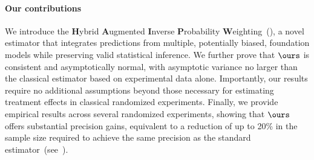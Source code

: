 \paragraph{Our contributions} We introduce the \textbf{H}ybrid \textbf{A}ugmented \textbf{I}nverse \textbf{P}robability \textbf{W}eighting~(\ours), a novel estimator that integrates predictions from multiple, potentially biased, foundation models while preserving valid statistical inference. We further prove that $\ours$ is consistent and asymptotically normal, with asymptotic variance no larger than the classical estimator based on experimental data alone. Importantly, our results require no additional assumptions beyond those necessary for estimating treatment effects in classical randomized experiments. Finally, we provide empirical results across several randomized experiments, showing that $\ours$ offers substantial precision gains, equivalent to a reduction of up to 20\% in the sample size required to achieve the same precision as the standard estimator~(see~). 




